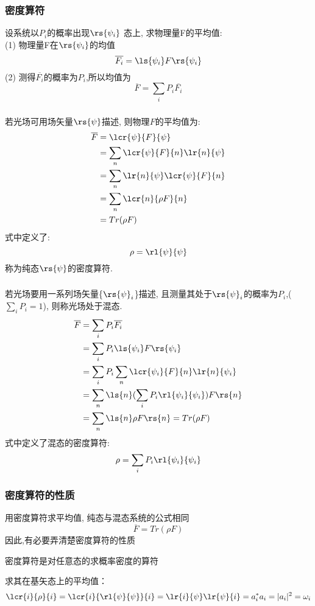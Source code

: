 \begin{frame} 
 \frametitle{密度算符}
    
    设系统以$P_i$的概率出现$\rs{\psi_i}$ 态上, 求物理量F的平均值:\\ 
    (1) 物理量F在$\rs{\psi_i}$的均值
    \[\overline{F_i}=\ls{\psi_i}F \rs{\psi_i}
    \]
    (2) 测得$\overline{F_i}$的概率为$P_i$,所以均值为
    \[\overline{F}= \sum_i P_i \overline{F_i}\]
\end{frame}

\begin{frame} 
 \frametitle{}
      若光场可用场矢量$\rs{\psi}$描述, 则物理$F$的平均值为:
      \[ \begin{aligned}
          \overline{F} &= \lcr{\psi}{F}{\psi} \\
          &= \sum_n \lcr{\psi}{F}{n}\lr{n}{\psi}   \\
          &= \sum_n \lr{n}{\psi} \lcr{\psi}{F}{n} \\ 
          &=  \sum_n \lcr{n}{\rho F}{n} \\
          &= Tr (\rho F)
      \end{aligned}\] 
    式中定义了:
    \[\rho = \rl{\psi}{\psi}  \]
    称为纯态$\rs{\psi}$的密度算符.
\end{frame}

\begin{frame} 
 \frametitle{}
      若光场要用一系列场矢量\{$\rs{\psi}_i$\}描述, 且测量其处于$\rs{\psi}_i$的概率为$P_i$,($\sum_i P_i =1$), 则称光场处于混态. 
      \[ \begin{aligned}
        \overline{F} &= \sum_i P_i \overline{F_i}\\
        &= \sum_i P_i \ls{\psi_i}F \rs{\psi_i} \\ 
        &= \sum_i P_i \sum_n \lcr{\psi_i}{F}{n}\lr{n}{\psi_i} \\
        &= \sum_n\ls{n} (\sum_i P_i \rl{\psi_i}{\psi_i} )F \rs{n} \\ 
        &= \sum_n\ls{n} \rho F\rs{n} = Tr (\rho F)
      \end{aligned}\]  
      式中定义了混态的密度算符:
      \[\rho = \sum_i P_i\rl{\psi_i}{\psi_i}  \]
\end{frame}

\begin{frame} 
 \frametitle{密度算符的性质}
 用密度算符求平均值, 纯态与混态系统的公式相同
 \[\overline{F} = Tr (\rho F) \]
 因此,有必要弄清楚密度算符的性质
 \begin{itemize}
    \Item 密度算符是对任意态的求概率密度的算符
    \end{itemize}
    求其在基矢态上的平均值：
    \[\lcr{i}{\rho}{i}=\lcr{i}{\rl{\psi}{\psi}}{i}=\lr{i}{\psi}\lr{\psi}{i}
    =a_i ^* a_i =|a_i|^2=\omega_i     
    \] 
 \end{frame}
 
